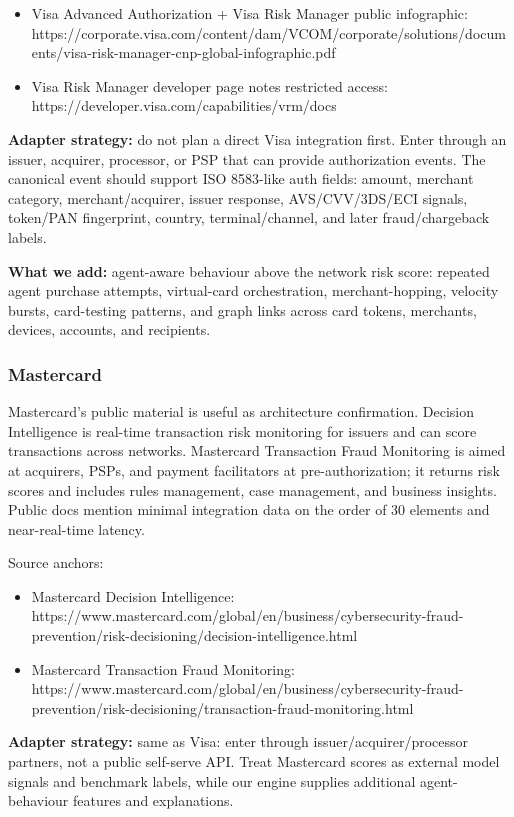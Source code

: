 \documentclass[11pt]{article}
\begin{document}
\begin{itemize}
  \item Visa Advanced Authorization + Visa Risk Manager public infographic: https://corporate.visa.com/content/dam/VCOM/corporate/solutions/documents/visa-risk-manager-cnp-global-infographic.pdf
  \item Visa Risk Manager developer page notes restricted access: https://developer.visa.com/capabilities/vrm/docs
\end{itemize}
\textbf{Adapter strategy:} do not plan a direct Visa integration first. Enter through an issuer, acquirer, processor, or PSP that can provide authorization events. The canonical event should support ISO 8583-like auth fields: amount, merchant category, merchant/acquirer, issuer response, AVS/CVV/3DS/ECI signals, token/PAN fingerprint, country, terminal/channel, and later fraud/chargeback labels.

\textbf{What we add:} agent-aware behaviour above the network risk score: repeated agent purchase attempts, virtual-card orchestration, merchant-hopping, velocity bursts, card-testing patterns, and graph links across card tokens, merchants, devices, accounts, and recipients.

\subsubsection*{Mastercard}
Mastercard's public material is useful as architecture confirmation. Decision Intelligence is real-time transaction risk monitoring for issuers and can score transactions across networks. Mastercard Transaction Fraud Monitoring is aimed at acquirers, PSPs, and payment facilitators at pre-authorization; it returns risk scores and includes rules management, case management, and business insights. Public docs mention minimal integration data on the order of 30 elements and near-real-time latency.

Source anchors:

\begin{itemize}
  \item Mastercard Decision Intelligence: https://www.mastercard.com/global/en/business/cybersecurity-fraud-prevention/risk-decisioning/decision-intelligence.html
  \item Mastercard Transaction Fraud Monitoring: https://www.mastercard.com/global/en/business/cybersecurity-fraud-prevention/risk-decisioning/transaction-fraud-monitoring.html
\end{itemize}
\textbf{Adapter strategy:} same as Visa: enter through issuer/acquirer/processor partners, not a public self-serve API. Treat Mastercard scores as external model signals and benchmark labels, while our engine supplies additional agent-behaviour features and explanations.
\end{document}
